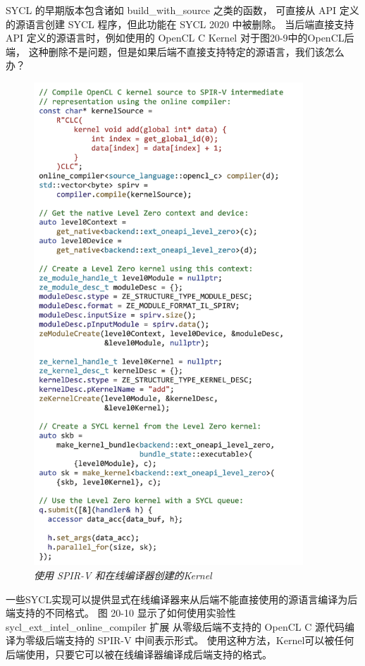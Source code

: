 SYCL 的早期版本包含诸如 build\_with\_source 之类的函数，
可直接从 API 定义的源语言创建 SYCL 程序，但此功能在 SYCL 2020 中被删除。
当后端直接支持 API 定义的源语言时，例如使用的 OpenCL C Kernel 对于图20-9中的OpenCL后端，
这种删除不是问题，但是如果后端不直接支持特定的源语言，我们该怎么办？

\begin{figure}[H]
	\centering
	\includegraphics[width=0.9\textwidth]{figs/F20.10.png}
	\caption{\textit{使用 SPIR-V 和在线编译器创建的Kernel }}
\end{figure}

一些SYCL实现可以提供显式在线编译器来从后端不能直接使用的源语言编译为后端支持的不同格式。 
图 20-10 显示了如何使用实验性 sycl\_ext\_intel\_online\_compiler 扩展
从零级后端不支持的 OpenCL C 源代码编译为零级后端支持的 SPIR-V 中间表示形式。 
使用这种方法，Kernel可以被任何后端使用，只要它可以被在线编译器编译成后端支持的格式。

